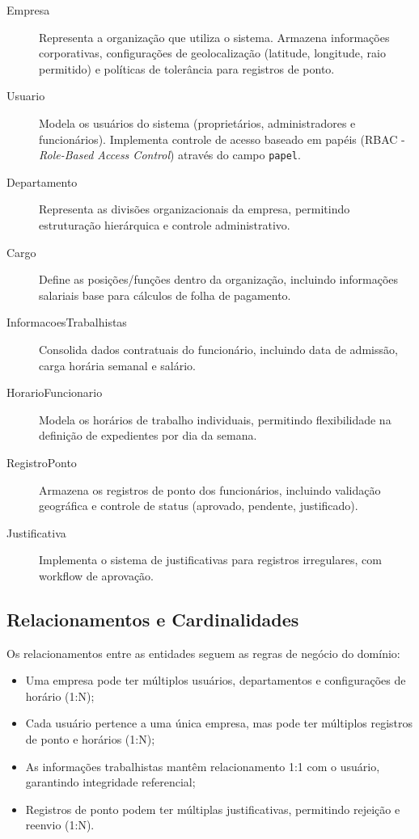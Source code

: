 \begin{description}
    \item[Empresa] Representa a organização que utiliza o sistema. Armazena informações corporativas, configurações de geolocalização (latitude, longitude, raio permitido) e políticas de tolerância para registros de ponto.
    
    \item[Usuario] Modela os usuários do sistema (proprietários, administradores e funcionários). Implementa controle de acesso baseado em papéis (RBAC - \textit{Role-Based Access Control}) através do campo \texttt{papel}.
    
    \item[Departamento] Representa as divisões organizacionais da empresa, permitindo estruturação hierárquica e controle administrativo.
    
    \item[Cargo] Define as posições/funções dentro da organização, incluindo informações salariais base para cálculos de folha de pagamento.
    
    \item[InformacoesTrabalhistas] Consolida dados contratuais do funcionário, incluindo data de admissão, carga horária semanal e salário.
    
    \item[HorarioFuncionario] Modela os horários de trabalho individuais, permitindo flexibilidade na definição de expedientes por dia da semana.
    
    \item[RegistroPonto] Armazena os registros de ponto dos funcionários, incluindo validação geográfica e controle de status (aprovado, pendente, justificado).
    
    \item[Justificativa] Implementa o sistema de justificativas para registros irregulares, com workflow de aprovação.
\end{description}

\subsection{Relacionamentos e Cardinalidades}

Os relacionamentos entre as entidades seguem as regras de negócio do domínio:

\begin{itemize}
    \item Uma empresa pode ter múltiplos usuários, departamentos e configurações de horário (1:N);
    \item Cada usuário pertence a uma única empresa, mas pode ter múltiplos registros de ponto e horários (1:N);
    \item As informações trabalhistas mantêm relacionamento 1:1 com o usuário, garantindo integridade referencial;
    \item Registros de ponto podem ter múltiplas justificativas, permitindo rejeição e reenvio (1:N).
\end{itemize}

